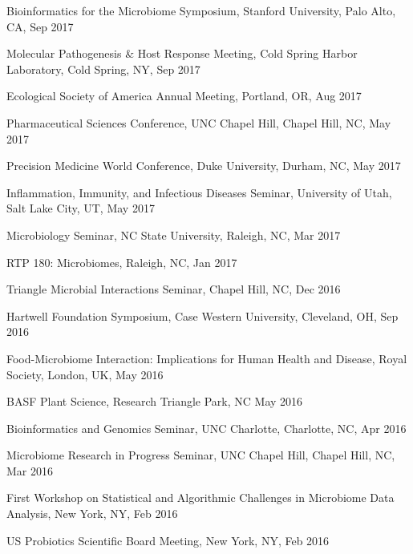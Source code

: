 \documentclass[overlapped,line,11pt]{res}
\begin{document}
\begin{resume}
\begin{revnumerate}[57]
\item {Bioinformatics for the Microbiome Symposium, Stanford University, Palo Alto, CA, Sep 2017}

\item {Molecular Pathogenesis \& Host Response Meeting, Cold Spring Harbor Laboratory, Cold Spring, NY, Sep 2017}

\item {Ecological Society of America Annual Meeting, Portland, OR, Aug 2017}

\item {Pharmaceutical Sciences Conference, UNC Chapel Hill, Chapel Hill, NC, May 2017}

\item {Precision Medicine World Conference, Duke University, Durham, NC, May 2017}

\item {Inflammation, Immunity, and Infectious Diseases Seminar, University of Utah, Salt Lake City, UT, May 2017}

\item {Microbiology Seminar, NC State University, Raleigh, NC, Mar 2017}

\item {RTP 180: Microbiomes, Raleigh, NC, Jan 2017}

\item {Triangle Microbial Interactions Seminar, Chapel Hill, NC, Dec 2016}

\item {Hartwell Foundation Symposium, Case Western University, Cleveland, OH, Sep 2016}

\item {Food-Microbiome Interaction: Implications for Human Health and Disease, Royal Society, London, UK, May 2016}

\item {BASF Plant Science, Research Triangle Park, NC May 2016}

\item {Bioinformatics and Genomics Seminar, UNC Charlotte, Charlotte, NC, Apr 2016}

\item {Microbiome Research in Progress Seminar, UNC Chapel Hill, Chapel Hill, NC, Mar 2016}

\item {First Workshop on Statistical and Algorithmic Challenges in Microbiome Data Analysis, New York, NY, Feb 2016}

\item {US Probiotics Scientific Board Meeting, New York, NY, Feb 2016}


\end{revnumerate}
\end{resume}
\end{document}
